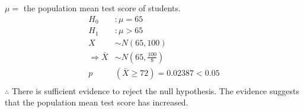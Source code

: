 \documentclass[a4paper,12pt]{article}
\begin{document}
$\mu =$ the population mean test score of students. 
\begin{align*}
H_0&: \mu = 65 \\
H_1&: \mu > 65 \\
X & \sim N(65, 100) \\
\Rightarrow \bar{X} & \sim N(65, \frac{100}{8}) \\
p&(\bar{X} \geqslant 72) = 0.02387 < 0.05 \\
\end{align*}  
$\therefore$ There is sufficient evidence to reject the null hypothesis. The evidence suggests that the population mean test score has increased. 
\end{document}
